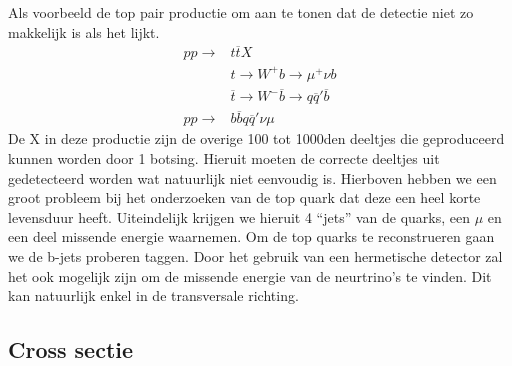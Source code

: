 \documentclass[../main.tex]{subfiles}
\begin{document}
Als voorbeeld de top pair productie om aan te tonen dat de detectie niet zo makkelijk is als het lijkt.
\begin{equation}
    \begin{aligned}
        \label{eq:top_prod}
        pp \rightarrow &t\overline t X\\
                       &t\rightarrow W^+b\rightarrow \mu^+\nu b\\
                       &\overline t \rightarrow W^-\overline b \rightarrow q\overline q' \overline b\\
        pp \rightarrow &b\overline bq\overline q' \nu\mu
    \end{aligned}
\end{equation}
De X in deze productie zijn de overige 100 tot 1000den deeltjes die geproduceerd kunnen worden door 1 botsing. Hieruit moeten de correcte deeltjes uit gedetecteerd worden wat natuurlijk niet eenvoudig is. Hierboven hebben we een groot probleem bij het onderzoeken van de top quark dat deze een heel korte levensduur heeft. Uiteindelijk krijgen we hieruit 4 ``jets'' van de quarks, een $\mu$ en een deel missende energie waarnemen. Om de top quarks te reconstrueren gaan we de b-jets proberen taggen. Door het gebruik van een hermetische detector zal het ook mogelijk zijn om de missende energie van de neurtrino's te vinden. Dit kan natuurlijk enkel in de transversale richting.

\subsection{Cross sectie}%
\label{sub:cross_sectie}
\end{document}
